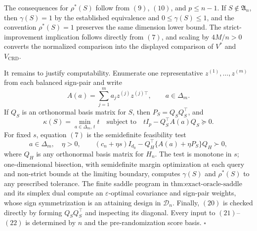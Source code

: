 The consequences for \(\rho^*(S)\) follow from \((9)\), \((10)\), and \(p\leq n-1\). If \(S\notin\mathfrak A_n\), then \(\gamma(S)=1\) by the established equivalence and \(0\leq\gamma(S)\leq1\), and the convention \(\rho^*(S)=1\) preserves the same dimension lower bound. The strict-improvement implication follows directly from \((7)\), and scaling by \(4M/n>0\) converts the normalized comparison into the displayed comparison of \(V^*\) and \(V_{\mathrm{CRD}}\).

It remains to justify computability. Enumerate one representative \(z^{(1)},\ldots,z^{(m)}\) from each balanced sign-pair and write
\[
A(a)=\sum_{j=1}^m a_jz^{(j)}z^{(j)\top},
\qquad a\in\Delta_m.
\]
If \(Q_S\) is an orthonormal basis matrix for \(S\), then \(P_S=Q_SQ_S^\top\), and
\[
\kappa(S)=\min_{a\in\Delta_m,\,t}t
\quad\text{subject to}\quad
tI_p-Q_S^\top A(a)Q_S\succeq0.
\tag{21}
\]
For fixed \(s\), equation \((7)\) is the semidefinite feasibility test
\[
a\in\Delta_m,\quad \eta>0,\qquad
(c_n+\eta s)I_{d_0}
-Q_H^\top\{A(a)+\eta P_S\}Q_H\succ0,
\tag{22}
\]
where \(Q_H\) is any orthonormal basis matrix for \(H_n\). The test is monotone in \(s\); one-dimensional bisection, with semidefinite margin optimization at each query and non-strict bounds at the limiting boundary, computes \(\gamma(S)\) and \(\rho^*(S)\) to any prescribed tolerance. The finite saddle program in \(\text{thm:exact-oracle-saddle}\) and its simplex dual compute an \(\varepsilon\)-optimal covariance and sign-pair weights, whose sign symmetrization is an attaining design in \(\mathcal D_n\). Finally, \((20)\) is checked directly by forming \(Q_SQ_S^\top\) and inspecting its diagonal. Every input to \((21)\)--\((22)\) is determined by \(n\) and the pre-randomization score basis. \(\square\)